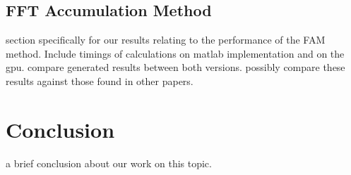 \subsection{FFT Accumulation Method}
\label{sect:FAM_result}
section specifically for our results relating to the performance of the FAM method.  Include timings of calculations on matlab implementation and on the gpu.  compare generated results between both versions.  possibly compare these results against those found in other papers.

\section{Conclusion}
a brief conclusion about our work on this topic.
